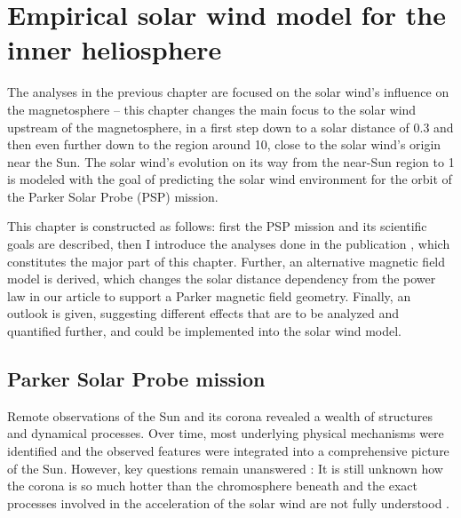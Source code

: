 
\chapter{Empirical solar wind model for the inner heliosphere}
\label{chap:empirical_solar_wind_model_for_the_inner_heliosphere}

The analyses in the previous chapter are focused on the solar wind's influence on the magnetosphere -- this chapter changes the main focus to the solar wind upstream of the magnetosphere, in a first step down to a solar distance of \SI{0.3}{\au} and then even further down to the region around \SI{10}{\Rs}, close to the solar wind's origin near the Sun. The solar wind's evolution on its way from the near-Sun region to \SI{1}{\au} is modeled with the goal of predicting the solar wind environment for the orbit of the Parker Solar Probe (PSP) mission.


This chapter is constructed as follows: first the PSP mission and its scientific goals are described, then I introduce the analyses done in the publication \citet{Venzmer2018}, which constitutes the major part of this chapter. Further, an alternative magnetic field model is derived, which changes the solar distance dependency from the power law in our article to support a Parker magnetic field geometry. Finally, an outlook is given, suggesting different effects that are to be analyzed and quantified further, and could be implemented into the solar wind model.


\section{Parker Solar Probe mission}
Remote observations of the Sun and its corona revealed a wealth of structures and dynamical processes. Over time, most underlying physical mechanisms were identified and the observed features were integrated into a comprehensive picture of the Sun. However, key questions remain unanswered \citep{McComas2007}: It is still unknown how the corona is so much hotter than the chromosphere beneath \citep{Klimchuk2006} and the exact processes involved in the acceleration of the solar wind are not fully understood \citep{Hollweg1985,Cranmer2017}.

